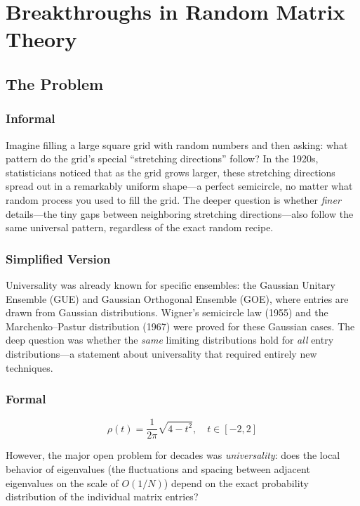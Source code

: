 \let\LocalMacro\relax

\chapter{Breakthroughs in Random Matrix Theory}

\section{The Problem}

\subsection{Informal}
Imagine filling a large square grid with random numbers and then asking: what pattern do the grid's special ``stretching directions'' follow? In the 1920s, statisticians noticed that as the grid grows larger, these stretching directions spread out in a remarkably uniform shape---a perfect semicircle, no matter what random process you used to fill the grid. The deeper question is whether \emph{finer} details---the tiny gaps between neighboring stretching directions---also follow the same universal pattern, regardless of the exact random recipe.

\subsection{Simplified Version}
Universality was already known for specific ensembles: the Gaussian Unitary Ensemble (GUE) and Gaussian Orthogonal Ensemble (GOE), where entries are drawn from Gaussian distributions. Wigner's semicircle law (1955) and the Marchenko--Pastur distribution (1967) were proved for these Gaussian cases. The deep question was whether the \emph{same} limiting distributions hold for \emph{all} entry distributions---a statement about universality that required entirely new techniques.

\subsection{Formal}
\begin{equation}
\rho(t) = \frac{1}{2\pi} \sqrt{4 - t^2}, \quad t \in [-2, 2]
\end{equation}

However, the major open problem for decades was \emph{universality}: does the local behavior of eigenvalues (the fluctuations and spacing between adjacent eigenvalues on the scale of $O(1/N)$) depend on the exact probability distribution of the individual matrix entries?

